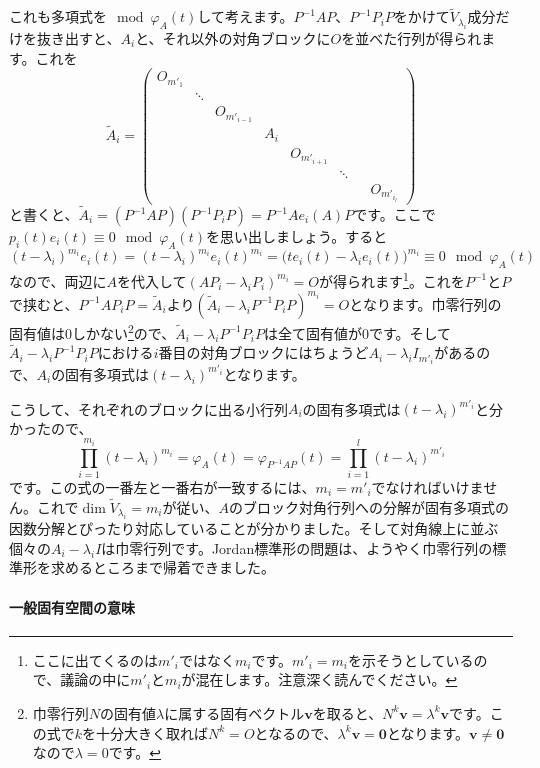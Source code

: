 これも多項式を$\!\!\!\mod \varphi_A(t)$して考えます。$P^{-1} A P$、$P^{-1} P_i P$をかけて$\tilde{V}_{\lambda_i}$成分だけを抜き出すと、$A_i$と、それ以外の対角ブロックに$O$を並べた行列が得られます。これを
\[
\tilde{A}_i = 
\begin{pmatrix}
O_{m'_1} \\
& \ddots \\
& & O_{m'_{i - 1}} \\
& & & A_i \\
& & & & O_{m'_{i + 1}} \\
& & & & & \ddots \\
& & & & & & & O_{m'_{i_l}}
\end{pmatrix}
\]
と書くと、$\tilde{A}_i = (P^{-1} A P)(P^{-1} P_i P) = P^{-1} A e_i(A) P$です。ここで$p_i(t) e_i(t) \equiv 0 \mod \varphi_A(t)$を思い出しましょう。すると
\[
(t - \lambda_i)^{m_i} e_i(t) = (t - \lambda_i)^{m_i} e_i(t)^{m_i} = \bigl(t e_i(t) - \lambda_i e_i(t)\bigr)^{m_i} \equiv 0 \mod \varphi_A(t)
\]
なので、両辺に$A$を代入して$(A P_i - \lambda_i P_i)^{m_i} = O$が得られます\footnote{ここに出てくるのは$m'_i$ではなく$m_i$です。$m'_i = m_i$を示そうとしているので、議論の中に$m'_i$と$m_i$が混在します。注意深く読んでください。}。これを$P^{-1}$と$P$で挟むと、$P^{-1} A P_i P = \tilde{A}_i$より$(\tilde{A}_i - \lambda_i P^{-1} P_i P)^{m_i} = O$となります。巾零行列の固有値は$0$しかない\footnote{巾零行列$N$の固有値$\lambda$に属する固有ベクトル$\bm{v}$を取ると、$N^k \bm{v} = \lambda^k \bm{v}$です。この式で$k$を十分大きく取れば$N^k = O$となるので、$\lambda^k \bm{v} = \bm{0}$となります。$\bm{v} \neq \bm{0}$なので$\lambda = 0$です。}ので、$\tilde{A}_i - \lambda_i P^{-1} P_i P$は全て固有値が$0$です。そして$\tilde{A}_i - \lambda_i P^{-1} P_i P$における$i$番目の対角ブロックにはちょうど$A_i - \lambda_i I_{m'_i}$があるので、$A_i$の固有多項式は$(t - \lambda_i)^{m'_i}$となります。

こうして、それぞれのブロックに出る小行列$A_i$の固有多項式は$(t - \lambda_i)^{m'_i}$と分かったので、
\[
\prod_{i = 1}^{m_i} (t - \lambda_i)^{m_i} = \varphi_A(t) = \varphi_{P^{-1} A P}(t) = \prod_{i = 1}^l (t - \lambda_i)^{m'_i}
\]
です。この式の一番左と一番右が一致するには、$m_i = m'_i$でなければいけません。これで$\dim \tilde{V}_{\lambda_i} = m_i$が従い、$A$のブロック対角行列への分解が固有多項式の因数分解とぴったり対応していることが分かりました。そして対角線上に並ぶ個々の$A_i - \lambda_i I$は巾零行列です。Jordan標準形の問題は、ようやく巾零行列の標準形を求めるところまで帰着できました。

\paragraph{一般固有空間の意味}

